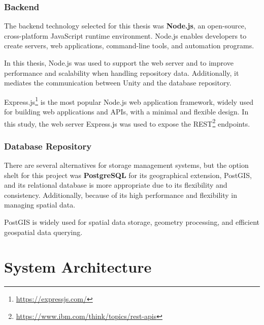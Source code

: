 \subsubsection{Backend}

The backend technology selected for this thesis was \textbf{Node.js}, an open-source, cross-platform JavaScript runtime environment. 
Node.js enables developers to create servers, web applications, command-line tools, and automation programs.

In this thesis, Node.js was used to support the web server and to improve performance and scalability when handling repository data. 
Additionally, it mediates the communication between Unity and the database repository.

Express.js\footnote{\url{https://expressjs.com/}} is the most popular Node.js web application framework, widely used for building web applications and \glspl{API}, with a minimal and flexible design.
In this study, the web server Express.js was used to expose the \gls{REST}\footnote{\url{https://www.ibm.com/think/topics/rest-apis}} endpoints.


\subsubsection{Database Repository}
\label{sec:repos}

There are several alternatives for storage management systems, but the option shelt for this project was \textbf{PostgreSQL} for its geographical extension, PostGIS, and its relational database is more appropriate due to its flexibility and consistency.
Additionally, because of its high performance and flexibility in managing spatial data. 

PostGIS is widely used for spatial data storage, geometry processing, and efficient geospatial data querying.


\section{System Architecture}
\label{sec:architecture}

